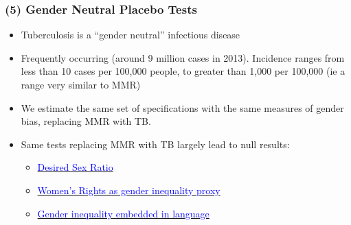 \documentclass[9pt,letterpaper,subeqn]{beamer}
\begin{document}
\begin{frame}[label=placebos]
\frametitle{(5) Gender Neutral Placebo Tests}
\begin{itemize}
\setlength{\itemsep}{15pt}
  \item Tuberculosis is a ``gender neutral'' infectious disease
  \item Frequently occurring (around 9 million cases in 2013). Incidence ranges
        from less than 10 cases per 100,000 people, to greater than 1,000 per
        100,000 (ie a range very similar to MMR)
  \item We estimate the same set of specifications with the same measures of
        gender bias, replacing MMR with TB.
  \item Same tests replacing MMR with TB largely lead to null results:
  \begin{itemize}
    \item \hyperlink{placebo2}{\textcolor{blue}{Desired Sex Ratio}}
    \item \hyperlink{placebo1}{\textcolor{blue}{Women's Rights as gender
                                                inequality proxy}}
    \item \hyperlink{placebo3}{\textcolor{blue}{Gender inequality embedded in
                                                language}}
  \end{itemize}
\end{itemize}
\end{frame}
\end{document}
